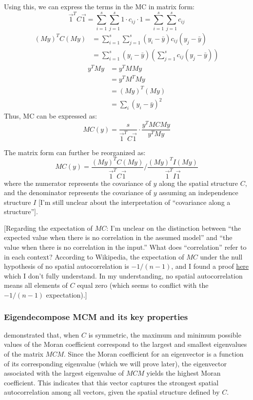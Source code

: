 \documentclass[12pt]{article}
\begin{document}
Using this, we can express the terms in the MC in matrix form:
\[
  \vec{1}^T C \vec{1} = \sum_{i=1}^s \sum_{j=1}^s 1 \cdot c_{i j} \cdot 1 = \sum_{i=1}^s \sum_{j=1}^s c_{i j} 
\]
\begin{align*}
  (M y)^T C (M y) & = \sum_{i=1}^s \sum_{j=1}^s (y_i - \bar{y}) c_{ij} (y_{j} - \bar{y}) \\
                  & = \sum_{i=1}^s (y_i - \bar{y}) \left( \sum_{j=1}^s c_{ij} (y_j - \bar{y}) \right)
\end{align*}
\begin{align*}
  y^T M y & = y^T M M y \\
          & = y^T M^T M y \\
          & = (M y)^T (M y) \\
          & = \sum_i (y_i - \bar{y})^2
\end{align*}
Thus, MC can be expressed as:
\[
  M C(y) = \frac{s}{\vec{1}^T C \vec{1}} \cdot \frac{y^T M C M y}{y^T M y}
\]

The matrix form can further be reorganized as:
\[
  M C (y) = \frac{(M y)^T C (M y)}{\vec{1}^T C \vec{1}} / \frac{(M y)^T I (M y)}{\vec{1}^T I \vec{1}}
\]
where the numerator represents the covariance of \( y \) along the spatial structure \( C \), and the denominator represents the covariance of \( y \) assuming an independence structure \( I \) [I'm still unclear about the interpretation of ``covariance along a structure''].

[Regarding the expectation of \( M C \): I'm unclear on the distinction between ``the expected value when there is no correlation in the assumed model'' and ``the value when there is no correlation in the input.'' What does ``correlation'' refer to in each context? According to Wikipedia, the expectation of \( M C \) under the null hypothesis of no spatial autocorrelation is \( -1 / (n - 1) \), and I found a proof \href{https://stats.stackexchange.com/questions/567411/expectation-and-variance-of-morans-i-under-the-null}{here} which I don’t fully understand. In my understanding, no spatial autocorrelation means all elements of \( C \) equal zero (which seems to conflict with the \( -1 / (n - 1) \) expectation).]

\subsubsection*{Eigendecompose MCM and its key properties}

\citet{de1984extreme} demonstrated that, when \( C \) is symmetric, the maximum and minimum possible values of the Moran coefficient correspond to the largest and smallest eigenvalues of the matrix \( MCM \). Since the Moran coefficient for an eigenvector is a function of its corresponding eigenvalue (which we will prove later), the eigenvector associated with the largest eigenvalue of \( MCM \) yields the highest Moran coefficient. This indicates that this vector captures the strongest spatial autocorrelation among all vectors, given the spatial structure defined by \( C \).
\end{document}

